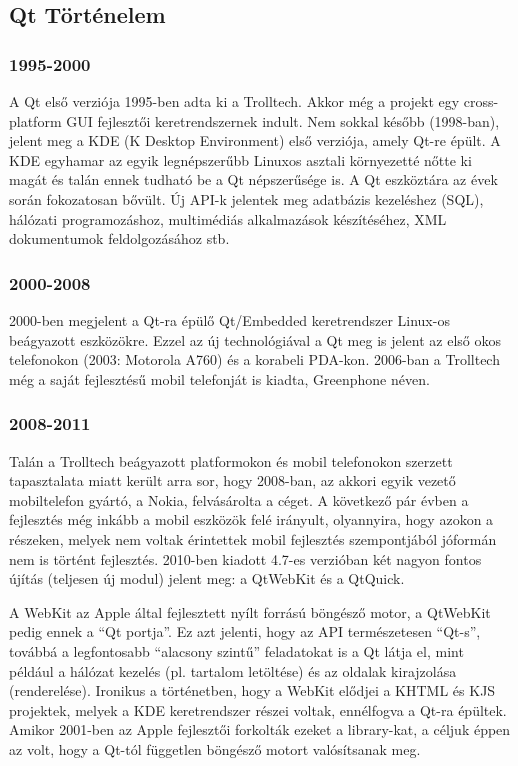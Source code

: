 \documentclass[12pt]{report}
\begin{document}
\subsection{Qt Történelem}
\subsubsection{1995-2000}
A Qt első verziója 1995-ben adta ki a Trolltech. Akkor még a projekt egy
cross-platform GUI fejlesztői keretrendszernek indult.
Nem sokkal később (1998-ban), jelent meg a
KDE (K Desktop Environment) első verziója, amely Qt-re épült.
A KDE egyhamar az egyik legnépszerűbb Linuxos asztali környezetté nőtte ki magát
és talán ennek tudható be a Qt népszerűsége is.
A Qt eszköztára az évek során fokozatosan
bővült. Új API-k jelentek meg adatbázis kezeléshez (SQL), hálózati programozáshoz,
multimédiás alkalmazások készítéséhez, XML dokumentumok feldolgozásához stb.

\subsubsection{2000-2008}
2000-ben megjelent a Qt-ra épülő Qt/Embedded keretrendszer Linux-os beágyazott eszközökre.
Ezzel az új technológiával a Qt meg is jelent az első okos telefonokon (2003: Motorola A760)
és a korabeli PDA-kon. 2006-ban a Trolltech még a saját fejlesztésű mobil telefonját is
kiadta, Greenphone néven.

\subsubsection{2008-2011}
Talán a Trolltech beágyazott platformokon és mobil telefonokon szerzett tapasztalata
miatt került arra sor, hogy 2008-ban, az akkori egyik vezető mobiltelefon gyártó, a Nokia,
felvásárolta a céget. A következő pár évben a fejlesztés még inkább a mobil eszközök
felé irányult, olyannyira, hogy azokon a részeken, melyek nem voltak érintettek mobil
fejlesztés szempontjából jóformán nem is történt fejlesztés.
2010-ben kiadott 4.7-es verzióban két nagyon fontos újítás (teljesen új modul) jelent meg:
a QtWebKit és a QtQuick.

A WebKit az Apple által fejlesztett nyílt forrású böngésző motor, a QtWebKit pedig ennek
a ``Qt portja''. Ez azt jelenti, hogy az API természetesen ``Qt-s'', továbbá a legfontosabb
``alacsony szintű'' feladatokat is a Qt látja el, mint például a hálózat kezelés
(pl. tartalom letöltése) és az oldalak kirajzolása (renderelése).
Ironikus a történetben, hogy a WebKit elődjei a KHTML és KJS projektek, melyek a KDE
keretrendszer részei voltak, ennélfogva a Qt-ra épültek. Amikor 2001-ben az Apple
fejlesztői forkolták ezeket a library-kat, a céljuk éppen az volt, hogy a Qt-tól független
böngésző motort valósítsanak meg.
\end{document}
